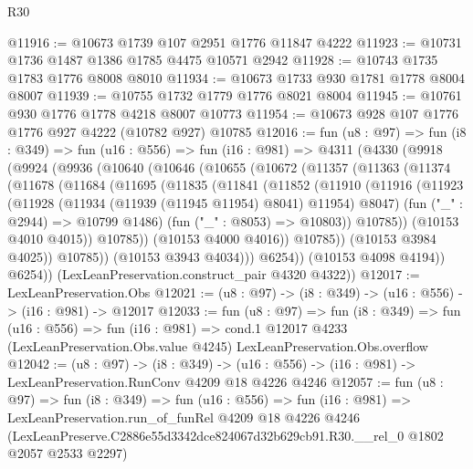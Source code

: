 \begin{lexlean}{R30}
\begin{coremodule}
@11916 := @10673 @1739 @107 @2951 @1776 @11847 @4222
@11923 := @10731 @1736 @1487 @1386 @1785 @4475 @10571 @2942
@11928 := @10743 @1735 @1783 @1776 @8008 @8010
@11934 := @10673 @1733 @930 @1781 @1778 @8004 @8007
@11939 := @10755 @1732 @1779 @1776 @8021 @8004
@11945 := @10761 @930 @1776 @1778 @4218 @8007 @10773
@11954 := @10673 @928 @107 @1776 @1776 @927 @4222 (@10782 @927) @10785
@12016 := fun (u8 : @97) =>
  fun (i8 : @349) =>
  fun (u16 : @556) =>
  fun (i16 : @981) =>
  @4311
    (@4330
      (@9918
        (@9924
          (@9936
            (@10640
              (@10646
                (@10655
                  (@10672
                    (@11357
                      (@11363
                        (@11374
                          (@11678
                            (@11684
                              (@11695
                                (@11835
                                  (@11841
                                    (@11852
                                      (@11910
                                        (@11916
                                          (@11923
                                            (@11928
                                              (@11934 (@11939 (@11945 @11954) @8041) @11954)
                                              @8047)
                                            (fun ("_" : @2944) => @10799 @1486)
                                            (fun ("_" : @8053) => @10803))
                                          @10785))
                                      (@10153 @4010 @4015))
                                    @10785))
                                (@10153 @4000 @4016))
                              @10785))
                          (@10153 @3984 @4025))
                        @10785))
                    (@10153 @3943 @4034)))
                @6254))
            (@10153 @4098 @4194))
          @6254))
      (LexLeanPreservation.construct_pair @4320 @4322))
@12017 := LexLeanPreservation.Obs
@12021 := (u8 : @97) -> (i8 : @349) -> (u16 : @556) -> (i16 : @981) -> @12017
@12033 := fun (u8 : @97) =>
  fun (i8 : @349) =>
  fun (u16 : @556) =>
  fun (i16 : @981) =>
  cond.{1} @12017 @4233 (LexLeanPreservation.Obs.value @4245) LexLeanPreservation.Obs.overflow
@12042 := (u8 : @97) ->
  (i8 : @349) -> (u16 : @556) -> (i16 : @981) -> LexLeanPreservation.RunConv @4209 @18 @4226 @4246
@12057 := fun (u8 : @97) =>
  fun (i8 : @349) =>
  fun (u16 : @556) =>
  fun (i16 : @981) =>
  LexLeanPreservation.run_of_funRel
    @4209
    @18
    @4226
    @4246
    (LexLeanPreserve.C2886e55d3342dce824067d32b629cb91.R30.__rel_0 @1802 @2057 @2533 @2297)
\end{coremodule}
\end{lexlean}
